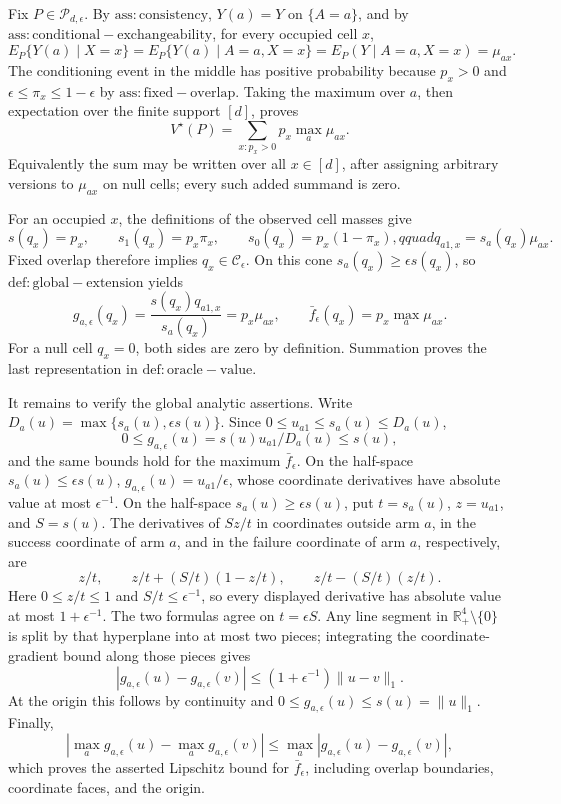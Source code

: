 Fix \(P\in\mathcal P_{d,\epsilon}\).  By \(\mathrm{ass:consistency}\), \(Y(a)=Y\) on \(\{A=a\}\), and by \(\mathrm{ass:conditional-exchangeability}\), for every occupied cell \(x\),
\[
 E_P\{Y(a)\mid X=x\}=E_P\{Y(a)\mid A=a,X=x\}=E_P(Y\mid A=a,X=x)=\mu_{ax}.
\]
The conditioning event in the middle has positive probability because \(p_x>0\) and \(\epsilon\leq\pi_x\leq1-\epsilon\) by \(\mathrm{ass:fixed-overlap}\).  Taking the maximum over \(a\), then expectation over the finite support \([d]\), proves
\[
 V^\star(P)=\sum_{x:p_x>0}p_x\max_a\mu_{ax}.
\]
Equivalently the sum may be written over all \(x\in[d]\), after assigning arbitrary versions to \(\mu_{ax}\) on null cells; every such added summand is zero.

For an occupied \(x\), the definitions of the observed cell masses give
\[
 s(q_x)=p_x,\qquad s_1(q_x)=p_x\pi_x,\qquad
 s_0(q_x)=p_x(1-\pi_x),qquad q_{a1,x}=s_a(q_x)\mu_{ax}.
\]
Fixed overlap therefore implies \(q_x\in\mathcal C_\epsilon\).  On this cone \(s_a(q_x)\geq\epsilon s(q_x)\), so \(\mathrm{def:global-extension}\) yields
\[
 g_{a,\epsilon}(q_x)
 =\frac{s(q_x)q_{a1,x}}{s_a(q_x)}
 =p_x\mu_{ax},
 \qquad
 \bar f_\epsilon(q_x)=p_x\max_a\mu_{ax}.
\]
For a null cell \(q_x=0\), both sides are zero by definition.  Summation proves the last representation in \(\mathrm{def:oracle-value}\).

It remains to verify the global analytic assertions.  Write \(D_a(u)=\max\{s_a(u),\epsilon s(u)\}\).  Since \(0\leq u_{a1}\leq s_a(u)\leq D_a(u)\),
\[
 0\leq g_{a,\epsilon}(u)=s(u)u_{a1}/D_a(u)\leq s(u),
\]
and the same bounds hold for the maximum \(\bar f_\epsilon\).  On the half-space \(s_a(u)\leq\epsilon s(u)\), \(g_{a,\epsilon}(u)=u_{a1}/\epsilon\), whose coordinate derivatives have absolute value at most \(\epsilon^{-1}\).  On the half-space \(s_a(u)\geq\epsilon s(u)\), put \(t=s_a(u)\), \(z=u_{a1}\), and \(S=s(u)\).  The derivatives of \(Sz/t\) in coordinates outside arm \(a\), in the success coordinate of arm \(a\), and in the failure coordinate of arm \(a\), respectively, are
\[
 z/t,\qquad z/t+(S/t)(1-z/t),\qquad z/t-(S/t)(z/t).
\]
Here \(0\leq z/t\leq1\) and \(S/t\leq\epsilon^{-1}\), so every displayed derivative has absolute value at most \(1+\epsilon^{-1}\).  The two formulas agree on \(t=\epsilon S\).  Any line segment in \(\mathbb R_+^4\setminus\{0\}\) is split by that hyperplane into at most two pieces; integrating the coordinate-gradient bound along those pieces gives
\[
 |g_{a,\epsilon}(u)-g_{a,\epsilon}(v)|
 \leq(1+\epsilon^{-1})\|u-v\|_1.
\]
At the origin this follows by continuity and \(0\leq g_{a,\epsilon}(u)\leq s(u)=\|u\|_1\).  Finally,
\[
 |\max_a g_{a,\epsilon}(u)-\max_a g_{a,\epsilon}(v)|
 \leq\max_a|g_{a,\epsilon}(u)-g_{a,\epsilon}(v)|,
\]
which proves the asserted Lipschitz bound for \(\bar f_\epsilon\), including overlap boundaries, coordinate faces, and the origin.